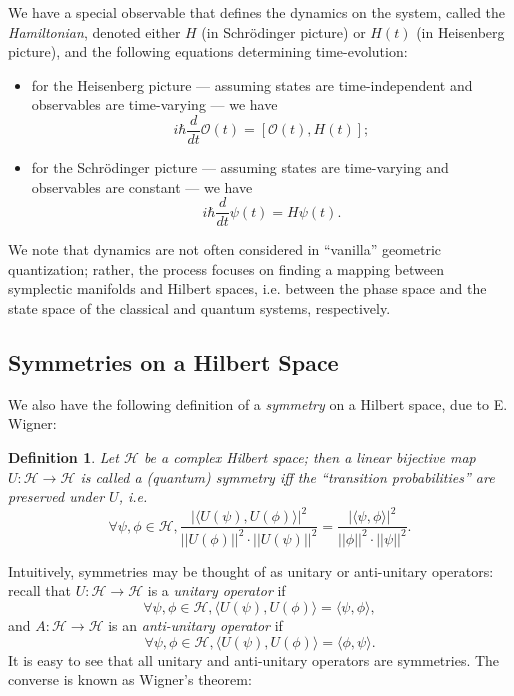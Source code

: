 \documentclass{tufte-handout}
\newtheorem{defn}{Definition}
\begin{document}
We have a special observable that defines the dynamics on the system, called the \emph{Hamiltonian}, denoted either $H$ (in Schr\"{o}dinger picture) or $H(t)$ (in Heisenberg picture), and the following equations determining time-evolution:
\begin{itemize}
\item for the Heisenberg picture --- assuming states are time-independent and observables are time-varying --- we have
$$
i\hbar \frac{d}{dt} \mathcal{O}(t) = [\mathcal{O}(t), H(t)];
$$

\item for the Schr\"{o}dinger picture --- assuming states are time-varying and observables are constant --- we have 
$$
i\hbar \frac{d}{dt}\psi(t) = H\psi(t).
$$
\end{itemize}

We note that dynamics are not often considered in ``vanilla'' geometric quantization; rather, the process focuses on finding a mapping between symplectic manifolds and Hilbert spaces, i.e. between the phase space and the state space of the classical and quantum systems, respectively.

\subsection{Symmetries on a Hilbert Space}
We also have the following definition of a \emph{symmetry} on a Hilbert space, due to E. Wigner:
\begin{defn}
Let $\mathcal{H}$ be a complex Hilbert space; then a linear bijective map $U: \mathcal{H} \to \mathcal{H}$ is called a (quantum) \emph{symmetry} iff the ``transition probabilities'' are preserved under $U$, i.e.
$$
\forall \psi,\phi \in \mathcal{H}, \frac{|\langle U(\psi),U(\phi)\rangle|^2}{|| U(\phi) ||^2 \cdot || U(\psi) ||^2} = \frac{|\langle \psi,\phi\rangle|^2}{|| \phi ||^2 \cdot || \psi ||^2}.
$$
\end{defn}
Intuitively, symmetries may be thought of as unitary or anti-unitary operators: recall that $U: \mathcal{H} \to \mathcal{H}$ is a \emph{unitary operator} if
$$
\forall \psi,\phi \in \mathcal{H}, \langle U(\psi), U(\phi) \rangle = \langle \psi, \phi \rangle,
$$
and $A: \mathcal{H} \to \mathcal{H}$ is an \emph{anti-unitary operator} if
$$
\forall \psi,\phi \in \mathcal{H}, \langle U(\psi), U(\phi) \rangle = \langle \phi, \psi \rangle.
$$
It is easy to see that all unitary and anti-unitary operators are symmetries. The converse is known as Wigner's theorem:
\end{document}
